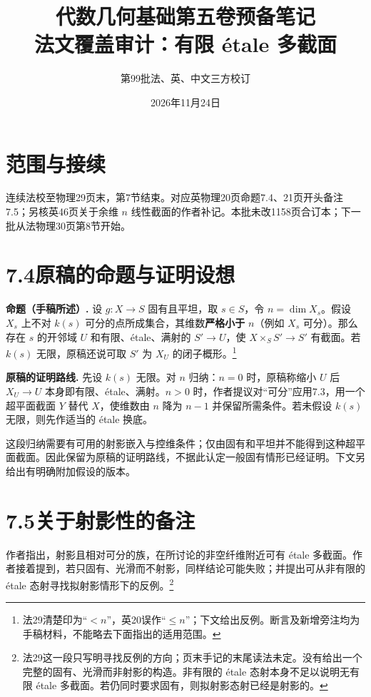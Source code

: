 \documentclass[openany,fontset=fandol]{ctexbook}
\begin{document}
\title{代数几何基础第五卷预备笔记\\法文覆盖审计：有限 étale 多截面}
\author{第99批\quad 法、英、中文三方校订}
\date{2026年11月24日}
\maketitle

\section*{范围与接续}
连续法校至物理29页末，第7节结束。对应英物理20页命题7.4、21页开头备注7.5；另核英46页关于余维 $n$ 线性截面的作者补记。本批未改1158页合订本；下一批从法物理30页第8节开始。

\section*{7.4\quad 原稿的命题与证明设想}
\textbf{命题（手稿所述）.}
设 $g:X\to S$ 固有且平坦，取 $s\in S$，令 $n=\dim X_s$。假设 $X_s$ 上不对 $k(s)$ 可分的点所成集合，其维数\textbf{严格小于} $n$（例如 $X_s$ 可分）。那么存在 $s$ 的开邻域 $U$ 和有限、étale、满射的 $S'\to U$，使 $X\times_S S'\to S'$ 有截面。若 $k(s)$ 无限，原稿还说可取 $S'$ 为 $X_U$ 的闭子概形。\footnote{法29清楚印为“$<n$”，英20误作“$\le n$”；下文给出反例。断言及新增旁注均为手稿材料，不能略去下面指出的适用范围。}

\textbf{原稿的证明路线.}
先设 $k(s)$ 无限。对 $n$ 归纳：$n=0$ 时，原稿称缩小 $U$ 后 $X_U\to U$ 本身即有限、étale、满射。$n>0$ 时，作者提议对“可分”应用7.3，用一个超平面截面 $Y$ 替代 $X$，使维数由 $n$ 降为 $n-1$ 并保留所需条件。若未假设 $k(s)$ 无限，则先作适当的 étale 换底。

这段归纳需要有可用的射影嵌入与控维条件；仅由固有和平坦并不能得到这种超平面截面。因此保留为原稿的证明路线，不据此认定一般固有情形已经证明。下文另给出有明确附加假设的版本。

\section*{7.5\quad 关于射影性的备注}
作者指出，射影且相对可分的族，在所讨论的非空纤维附近可有 étale 多截面。作者接着提到，若只固有、光滑而不射影，同样结论可能失败；并提出可从非有限的 étale 态射寻找拟射影情形下的反例。\footnote{法29这一段只写明寻找反例的方向；页末手记的末尾读法未定。没有给出一个完整的固有、光滑而非射影的构造。非有限的 étale 态射本身不足以说明无有限 étale 多截面。若仍同时要求固有，则拟射影态射已经是射影的。}
\end{document}
